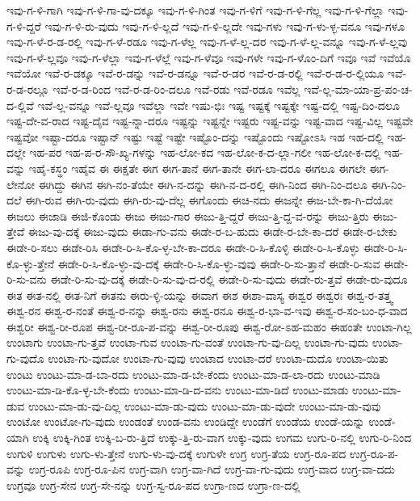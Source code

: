 {ಇವು-ಗ-ಳಿ-ಗಾಗಿ
ಇವು-ಗ-ಳಿ-ಗಾ-ವು-ದಕ್ಕೂ
ಇವು-ಗ-ಳಿ-ಗಿಂತ
ಇವು-ಗ-ಳಿಗೆ
ಇವು-ಗ-ಳಿ-ಗೆಲ್ಲ
ಇವು-ಗ-ಳಿ-ಗೆಲ್ಲಾ
ಇವು-ಗ-ಳಿ-ದ್ದರೆ
ಇವು-ಗ-ಳಿ-ರು-ವುದು
ಇವು-ಗ-ಳಿ-ಲ್ಲದೆ
ಇವು-ಗ-ಳಿ-ಲ್ಲದೇ
ಇವು-ಗಳು
ಇವು-ಗ-ಳು-ಳ್ಳ-ವನೂ
ಇವು-ಗಳೂ
ಇವು-ಗ-ಳೆ-ರ-ಡ-ರಲ್ಲಿ
ಇವು-ಗ-ಳೆ-ರಡೂ
ಇವು-ಗ-ಳೆಲ್ಲ
ಇವು-ಗ-ಳೆ-ಲ್ಲ-ದರ
ಇವು-ಗ-ಳೆ-ಲ್ಲ-ವನ್ನೂ
ಇವು-ಗ-ಳೆ-ಲ್ಲವು
ಇವು-ಗ-ಳೆ-ಲ್ಲವೂ
ಇವು-ಗ-ಳೆಲ್ಲಾ
ಇವು-ಗ-ಳೆಲ್ಲೆ
ಇವು-ಗ-ಳೆವೂ
ಇವು-ಗಳೇ
ಇವು-ಗ-ಳೊಂ-ದಿಗೆ
ಇವೂ
ಇವೆ
ಇವೆಯೊ
ಇವೆಯೋ
ಇವೆ-ರ-ಡಕ್ಕೂ
ಇವೆ-ರ-ಡನ್ನು
ಇವೆ-ರ-ಡನ್ನೂ
ಇವೆ-ರ-ಡರ
ಇವೆ-ರ-ಡ-ರಲ್ಲಿ
ಇವೆ-ರ-ಡ-ರ-ಲ್ಲಿಯೂ
ಇವೆ-ರ-ಡ-ರಲ್ಲೂ
ಇವೆ-ರ-ಡ-ರಿಂದ
ಇವೆ-ರ-ಡ-ರಿಂ-ದಲೂ
ಇವೆ-ರಡು
ಇವೆ-ರಡೂ
ಇವೆಲ್ಲ
ಇವೆ-ಲ್ಲ-ಮಾ-ಯಾ-ಪ್ರ-ಪಂ-ಚ-ದ-ಲ್ಲಿವೆ
ಇವೆ-ಲ್ಲ-ವನ್ನೂ
ಇವೆ-ಲ್ಲವೂ
ಇವೆಲ್ಲಾ
ಇವೇ
ಇಷು-ಭಿಃ
ಇಷ್ಟ
ಇಷ್ಟಕ್ಕೆ
ಇಷ್ಟಕ್ಕೇ
ಇಷ್ಟ-ದಲ್ಲಿ
ಇಷ್ಟ-ದಿಂ-ದಲೂ
ಇಷ್ಟ-ದೇ-ವ-ರಾದ
ಇಷ್ಟ-ದೈವ
ಇಷ್ಟ-ನ್ನಾ-ದರೂ
ಇಷ್ಟನ್ನು
ಇಷ್ಟನ್ನೇ
ಇಷ್ಟರು
ಇಷ್ಟ-ವನ್ನು
ಇಷ್ಟ-ವಾದ
ಇಷ್ಟ-ವಿಲ್ಲ
ಇಷ್ಟವೇ
ಇಷ್ಟವೋ
ಇಷ್ಟಾ-ದರೂ
ಇಷ್ಟಾನ್
ಇಷ್ಟು
ಇಷ್ಟೆ
ಇಷ್ಟೇ
ಇಷ್ಟೊಂ-ದನ್ನು
ಇಷ್ಟೊಂದು
ಇಷ್ಟೋಽಸಿ
ಇಹ
ಇಹ-ದಲ್ಲಿ
ಇಹ-ದಲ್ಲೇ
ಇಹ-ಪರ
ಇಹ-ಪ-ರ-ಸೌ-ಖ್ಯ-ಗಳನ್ನು
ಇಹ-ಲೋ-ಕದ
ಇಹ-ಲೋ-ಕ-ದ-ಲ್ಲಾ-ಗಲೀ
ಇಹ-ಲೋ-ಕ-ದಲ್ಲಿ
ಇಹ-ವನ್ನು
ಇಹೈ-ಕಸ್ಥಂ
ಇಹೈವ
ಈ
ಈಕ್ಷತೇ
ಈಗ
ಈಗ-ತಾನೆ
ಈಗ-ತಾನೇ
ಈಗ-ಲಾ-ದರೂ
ಈಗಲೂ
ಈಗಲೇ
ಈಗ-ಲೇನೋ
ಈಗಿದ್ದು
ಈಗಿನ
ಈಗಿ-ನಂ-ತೆಯೇ
ಈಗಿ-ನ-ದನ್ನು
ಈಗಿ-ನ-ದ-ರಲ್ಲಿ
ಈಗಿ-ನಿಂದ
ಈಗಿ-ನಿಂ-ದಲೂ
ಈಗಿ-ನಿಂ-ದಲೆ
ಈಗಿ-ರುವ
ಈಗಿ-ರು-ವುದು
ಈಗಿ-ರು-ವು-ದೆಲ್ಲ
ಈಗೊಂದು
ಈಚಿ-ನದು
ಈಜನ್ನೇ
ಈಜ-ಬೇ-ಕಾ-ಗಿ-ದೆಯೋ
ಈಜಲು
ಈಜಾಡಿ
ಈಜಿ-ಕೊಂಡು
ಈಜು
ಈಜು-ಗಾರ
ಈಜು-ತ್ತಿ-ದ್ದರೆ
ಈಜು-ತ್ತಿ-ದ್ದ-ವ-ರನ್ನು
ಈಜು-ತ್ತಿರು
ಈಜು-ತ್ತೇವೆ
ಈಜು-ವು-ದಕ್ಕೆ
ಈಜು-ವುದು
ಈಡಾ-ಗು-ವನು
ಈಡೇ-ರ-ಬ-ಹುದು
ಈಡೇ-ರ-ಬೇ-ಕಾ-ದರೆ
ಈಡೇ-ರ-ಬೇಕು
ಈಡೇ-ರಿ-ಸಲು
ಈಡೇ-ರಿಸಿ
ಈಡೇ-ರಿ-ಸಿ-ಕೊ-ಳ್ಳ-ಬೇ-ಕಾ-ದರೂ
ಈಡೇ-ರಿ-ಸಿ-ಕೊಳ್ಳಿ
ಈಡೇ-ರಿ-ಸಿ-ಕೊಳ್ಳು
ಈಡೇ-ರಿ-ಸಿ-ಕೊ-ಳ್ಳು-ತ್ತೇನೆ
ಈಡೇ-ರಿ-ಸಿ-ಕೊ-ಳ್ಳು-ವು-ದಕ್ಕೆ
ಈಡೇ-ರಿ-ಸಿ-ಕೊ-ಳ್ಳು-ವುವು
ಈಡೇ-ರಿ-ಸು-ತ್ತಾನೆ
ಈಡೇ-ರಿ-ಸುವ
ಈಡೇ-ರಿ-ಸು-ವನು
ಈಡೇ-ರಿ-ಸು-ವು-ದಕ್ಕೆ
ಈಡೇ-ರಿ-ಸು-ವು-ದ-ರಲ್ಲಿ
ಈಡೇ-ರಿ-ಸು-ವುದು
ಈಡೇ-ರು-ತ್ತವೆ
ಈಡೇ-ರು-ವುದೂ
ಈತ
ಈತ-ನಲ್ಲಿ
ಈತ-ನಿಗೆ
ಈತನು
ಈರು-ಳ್ಳಿ-ಯನ್ನು
ಈವಾಗ
ಈಶ
ಈಶಾ-ವಾಸ್ಯ
ಈಶ್ವರ
ಈಶ್ವರಃ
ಈಶ್ವ-ರ-ತತ್ತ್ವ
ಈಶ್ವ-ರನ
ಈಶ್ವ-ರ-ನಂತೆ
ಈಶ್ವ-ರ-ನನ್ನು
ಈಶ್ವ-ರನು
ಈಶ್ವ-ರನೂ
ಈಶ್ವ-ರ-ಭಾ-ವ-ಇವು
ಈಶ್ವ-ರ-ಸಂ-ಬಂ-ಧ-ವಾದ
ಈಶ್ವರೀ
ಈಶ್ವ-ರೀ-ರೂಪ
ಈಶ್ವ-ರೀ-ರೂ-ಪ-ವನ್ನು
ಈಶ್ವ-ರೀ-ರೂಪು
ಈಶ್ವ-ರೋ-ಽಹ-ಮಹಂ
ಈಹಂತೇ
ಉಂಟಾ-ಗಿಲ್ಲ
ಉಂಟಾಗು
ಉಂಟಾ-ಗು-ತ್ತವೆ
ಉಂಟಾ-ಗುವ
ಉಂಟಾ-ಗು-ವಂತೆ
ಉಂಟಾ-ಗು-ವು-ದಿಲ್ಲ
ಉಂಟಾ-ಗು-ವುದು
ಉಂಟಾ-ಗು-ವುದೊ
ಉಂಟಾ-ಗು-ವುದೋ
ಉಂಟಾ-ಗು-ವುವು
ಉಂಟಾದ
ಉಂಟಾ-ದರೆ
ಉಂಟಾ-ದುದೊ
ಉಂಟಾ-ಯಿತು
ಉಂಟು
ಉಂಟು-ಮಾ-ಡ-ಬಾ-ರದು
ಉಂಟು-ಮಾ-ಡ-ಬೇ-ಕೆಂದು
ಉಂಟು-ಮಾ-ಡ-ಲಾ-ರದು
ಉಂಟು-ಮಾಡಿ
ಉಂಟು-ಮಾ-ಡಿ-ಕೊ-ಳ್ಳ-ಬೇ-ಕೆಂದು
ಉಂಟು-ಮಾ-ಡಿ-ದ-ವನು
ಉಂಟು-ಮಾ-ಡಿದೆ
ಉಂಟು-ಮಾಡು
ಉಂಟು-ಮಾ-ಡುವ
ಉಂಟು-ಮಾ-ಡು-ವು-ದಿಲ್ಲ
ಉಂಟು-ಮಾ-ಡು-ವುದು
ಉಂಟು-ಮಾ-ಡು-ವುದೇ
ಉಂಟು-ಮಾ-ಡು-ವುವು
ಉಂಟೋ
ಉಂಟೋ-ಗು-ವುದು
ಉಂಡಂತೆ
ಉಂಡ-ವನು
ಉಂಡಿದ್ದೇ
ಉಂಡೆಗೆ
ಉಂಡೆಯ
ಉಂಡೆ-ಯನ್ನು
ಉಂಡೆ-ಯಾಗಿ
ಉಕ್ಕಿ
ಉಕ್ಕಿ-ಗಿಂತ
ಉಕ್ಕಿ-ಬ-ರು-ತ್ತಿದೆ
ಉಕ್ಕು-ತ್ತಿ-ರು-ವಾಗ
ಉಕ್ಕು-ವುದು
ಉಗಮ
ಉಗು-ರಿ-ನಲ್ಲಿ
ಉಗು-ರಿ-ನಿಂದ
ಉಗುಳಿ
ಉಗುಳು
ಉಗು-ಳು-ತ್ತೇನೆ
ಉಗು-ಳು-ವು-ದಕ್ಕೆ
ಉಗುಳೇ
ಉಗ್ರ
ಉಗ್ರ-ತೆಯ
ಉಗ್ರ-ರೂ-ಪದ
ಉಗ್ರ-ರೂ-ಪ-ವನ್ನು
ಉಗ್ರ-ರೂಪಿ
ಉಗ್ರ-ರೂ-ಪಿನ
ಉಗ್ರ-ವಾಗಿ
ಉಗ್ರ-ವಾ-ಗಿದೆ
ಉಗ್ರ-ವಾ-ಗು-ವುದು
ಉಗ್ರ-ವಾದ
ಉಗ್ರ-ವಾ-ದದು
ಉಗ್ರವೂ
ಉಗ್ರ-ಸೇನ
ಉಗ್ರ-ಸೇ-ನನ್ನು
ಉಗ್ರ-ಸ್ವ-ರೂ-ಪದ
ಉಗ್ರಾ-ಣದ
ಉಗ್ರಾ-ಣ-ದಲ್ಲಿ
}
